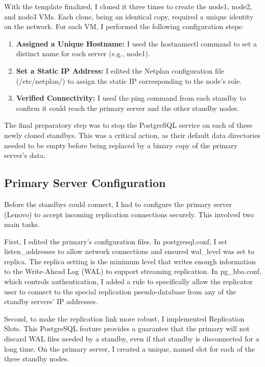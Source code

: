 \documentclass[conference]{IEEEtran}
\begin{document}
With the template finalized, I cloned it three times to create the node1, node2, and node3 VMs. Each clone, being an identical copy, required a unique identity on the network. For each VM, I performed the following configuration steps:

\begin{enumerate}

\item \textbf{Assigned a Unique Hostname:} I used the hostnamectl command to set a distinct name for each server (e.g., node1).

\item \textbf{Set a Static IP Address:} I edited the Netplan configuration file (/etc/netplan/) to assign the static IP corresponding to the node's role.

\item \textbf{Verified Connectivity:} I used the ping command from each standby to confirm it could reach the primary server and the other standby nodes.

\end{enumerate}

The final preparatory step was to stop the PostgreSQL service on each of these newly cloned standbys. This was a critical action, as their default data directories needed to be empty before being replaced by a binary copy of the primary server's data.

\subsection{Primary Server Configuration}

Before the standbys could connect, I had to configure the primary server (Lenovo) to accept incoming replication connections securely. This involved two main tasks.

First, I edited the primary's configuration files. In postgresql.conf, I set listen\_addresses to allow network connections and ensured wal\_level was set to replica. The replica setting is the minimum level that writes enough information to the Write-Ahead Log (WAL) to support streaming replication. In pg\_hba.conf, which controls authentication, I added a rule to specifically allow the replicator user to connect to the special replication pseudo-database from any of the standby servers' IP addresses.

Second, to make the replication link more robust, I implemented Replication Slots. This PostgreSQL feature provides a guarantee that the primary will not discard WAL files needed by a standby, even if that standby is disconnected for a long time. On the primary server, I created a unique, named slot for each of the three standby nodes.
\end{document}
